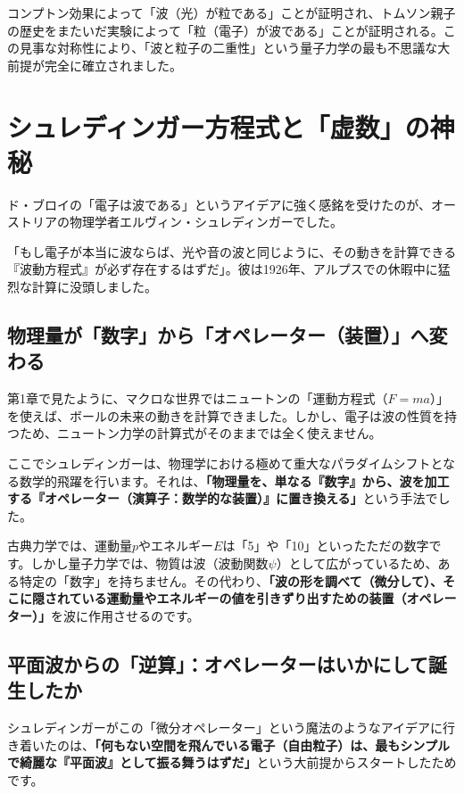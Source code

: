 コンプトン効果によって「波（光）が粒である」ことが証明され、トムソン親子の歴史をまたいだ実験によって「粒（電子）が波である」ことが証明される。この見事な対称性により、「波と粒子の二重性」という量子力学の最も不思議な大前提が完全に確立されました。

\section{シュレディンガー方程式と「虚数」の神秘}

ド・ブロイの「電子は波である」というアイデアに強く感銘を受けたのが、オーストリアの物理学者エルヴィン・シュレディンガーでした。

「もし電子が本当に波ならば、光や音の波と同じように、その動きを計算できる『波動方程式』が必ず存在するはずだ」。彼は1926年、アルプスでの休暇中に猛烈な計算に没頭しました。

\subsection{物理量が「数字」から「オペレーター（装置）」へ変わる}

第1章で見たように、マクロな世界ではニュートンの「運動方程式（\(F=ma\)）」を使えば、ボールの未来の動きを計算できました。しかし、電子は波の性質を持つため、ニュートン力学の計算式がそのままでは全く使えません。

ここでシュレディンガーは、物理学における極めて重大なパラダイムシフトとなる数学的飛躍を行います。それは、\textbf{「物理量を、単なる『数字』から、波を加工する『オペレーター（演算子：数学的な装置）』に置き換える」}という手法でした。

古典力学では、運動量\(p\)やエネルギー\(E\)は「5」や「10」といったただの数字です。しかし量子力学では、物質は波（波動関数\(\psi\)）として広がっているため、ある特定の「数字」を持ちません。その代わり、\textbf{「波の形を調べて（微分して）、そこに隠されている運動量やエネルギーの値を引きずり出すための装置（オペレーター）」}を波に作用させるのです。

\subsection{平面波からの「逆算」：オペレーターはいかにして誕生したか}

シュレディンガーがこの「微分オペレーター」という魔法のようなアイデアに行き着いたのは、\textbf{「何もない空間を飛んでいる電子（自由粒子）は、最もシンプルで綺麗な『平面波』として振る舞うはずだ」}という大前提からスタートしたためです。

